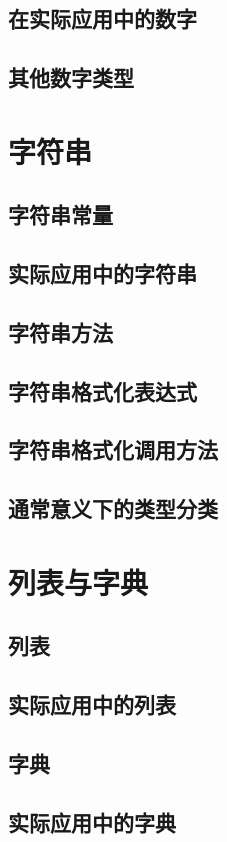 \subsection{在实际应用中的数字}
\subsection{其他数字类型}
\section{字符串}
\subsection{字符串常量}
\subsection{实际应用中的字符串}
\subsection{字符串方法}
\subsection{字符串格式化表达式}
\subsection{字符串格式化调用方法}
\subsection{通常意义下的类型分类}
\section{列表与字典}
\subsection{列表}
\subsection{实际应用中的列表}
\subsection{字典}
\subsection{实际应用中的字典}
